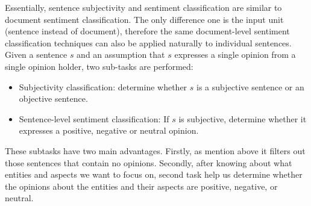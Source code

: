 \documentclass{article}
\begin{document}
Essentially, sentence subjectivity and sentiment classification are similar to document sentiment classification.
The only difference one is the input unit (sentence instead of document), therefore the same document-level sentiment classification techniques can also be applied naturally to individual sentences.
Given a sentence $s$ and an assumption that $s$ expresses a single opinion from a single opinion holder, two sub-tasks are performed:
\begin{itemize}
    \item Subjectivity classification: determine whether $s$ is a subjective sentence or an objective sentence.
    \item Sentence-level sentiment classification: If $s$ is subjective, determine whether it expresses a positive, negative or neutral opinion.
\end{itemize}
These subtasks have two main advantages. 
Firstly, as mention above it filters out those sentences that contain no opinions. 
Secondly, after knowing about what entities and aspects we want to focus on, second task help us determine whether the opinions about the entities and their aspects are positive, negative, or neutral. 
\end{document}
